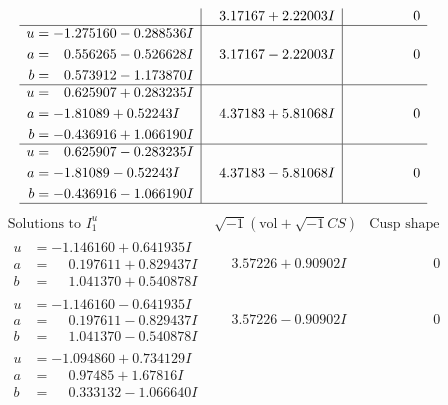 \documentclass[1p]{elsarticle_modified}
\theoremstyle{definition}
\newcommand{\I}{\sqrt{-1}}
\begin{document}
$$\begin{array}{c|c|c}
 & \phantom{-}3.17167 + 2.22003 I & \phantom{-0.000000 } 0 \\ \hline\begin{aligned}
u &= -1.275160 - 0.288536 I \\
a &= \phantom{-}0.556265 - 0.526628 I \\
b &= \phantom{-}0.573912 - 1.173870 I\end{aligned}
 & \phantom{-}3.17167 - 2.22003 I & \phantom{-0.000000 } 0 \\ \hline\begin{aligned}
u &= \phantom{-}0.625907 + 0.283235 I \\
a &= -1.81089 + 0.52243 I \\
b &= -0.436916 + 1.066190 I\end{aligned}
 & \phantom{-}4.37183 + 5.81068 I & \phantom{-0.000000 } 0 \\ \hline\begin{aligned}
u &= \phantom{-}0.625907 - 0.283235 I \\
a &= -1.81089 - 0.52243 I \\
b &= -0.436916 - 1.066190 I\end{aligned}
 & \phantom{-}4.37183 - 5.81068 I & \phantom{-0.000000 } 0\\
 \hline 
 \end{array}$$\newpage$$\begin{array}{c|c|c}  
\text{Solutions to }I^u_{1}& \I (\text{vol} + \sqrt{-1}CS) & \text{Cusp shape}\\
 \hline 
\begin{aligned}
u &= -1.146160 + 0.641935 I \\
a &= \phantom{-}0.197611 + 0.829437 I \\
b &= \phantom{-}1.041370 + 0.540878 I\end{aligned}
 & \phantom{-}3.57226 + 0.90902 I & \phantom{-0.000000 } 0 \\ \hline\begin{aligned}
u &= -1.146160 - 0.641935 I \\
a &= \phantom{-}0.197611 - 0.829437 I \\
b &= \phantom{-}1.041370 - 0.540878 I\end{aligned}
 & \phantom{-}3.57226 - 0.90902 I & \phantom{-0.000000 } 0 \\ \hline\begin{aligned}
u &= -1.094860 + 0.734129 I \\
a &= \phantom{-}0.97485 + 1.67816 I \\
b &= \phantom{-}0.333132 - 1.066640 I\end{aligned}

\end{array}$$
\end{document}
